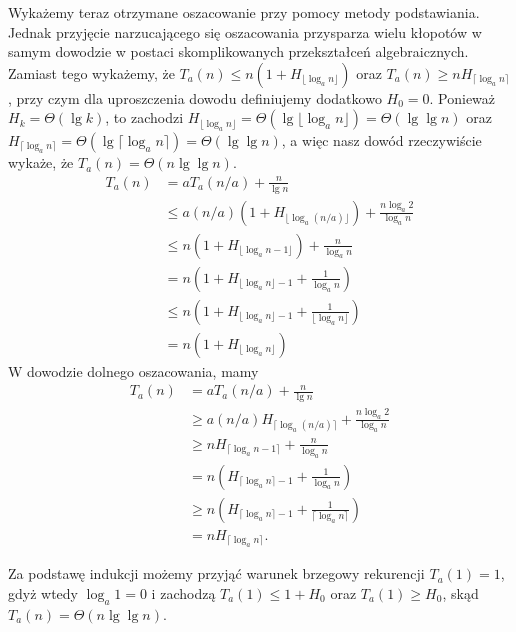 Wykażemy teraz otrzymane oszacowanie przy pomocy metody podstawiania. Jednak przyjęcie narzucającego się oszacowania przysparza wielu kłopotów w samym dowodzie w postaci skomplikowanych przekształceń algebraicznych. Zamiast tego wykażemy, że $T_a(n)\le n(1+H_{\lfloor\log_an\rfloor})$ oraz $T_a(n)\ge nH_{\lceil\log_an\rceil}$, przy czym dla uproszczenia dowodu definiujemy dodatkowo $H_0=0$. Ponieważ $H_k=\Theta(\lg k)$, to zachodzi $H_{\lfloor\log_an\rfloor}=\Theta(\lg\lfloor\log_an\rfloor)=\Theta(\lg\lg n)$ oraz $H_{\lceil\log_an\rceil}=\Theta(\lg\lceil\log_an\rceil)=\Theta(\lg\lg n)$, a więc nasz dowód rzeczywiście wykaże, że $T_a(n)=\Theta(n\lg\lg n)$.
\begin{align*}
	T_a(n) &= aT_a(n/a)+\frac{n}{\lg n} \\
	&\le a(n/a)(1+H_{\lfloor\log_a(n/a)\rfloor})+\frac{n\log_a2}{\log_an} \\
	&\le n(1+H_{\lfloor\log_an-1\rfloor})+\frac{n}{\log_an} \\
	&= n\left(1+H_{\lfloor\log_an\rfloor-1}+\frac{1}{\log_an}\right) \\
	&\le n\left(1+H_{\lfloor\log_an\rfloor-1}+\frac{1}{\lfloor\log_an\rfloor}\right) \\
	&= n(1+H_{\lfloor\log_an\rfloor})
\end{align*}
W dowodzie dolnego oszacowania, mamy
\begin{align*}
	T_a(n) &= aT_a(n/a)+\frac{n}{\lg n} \\
	&\ge a(n/a)H_{\lceil\log_a(n/a)\rceil}+\frac{n\log_a2}{\log_an} \\
	&\ge nH_{\lceil\log_an-1\rceil}+\frac{n}{\log_an} \\
	&= n\left(H_{\lceil\log_an\rceil-1}+\frac{1}{\log_an}\right) \\
	&\ge n\left(H_{\lceil\log_an\rceil-1}+\frac{1}{\lceil\log_an\rceil}\right) \\
	&= nH_{\lceil\log_an\rceil}.
\end{align*}

Za podstawę indukcji możemy przyjąć warunek brzegowy rekurencji $T_a(1)=1$, gdyż wtedy $\log_a1=0$ i zachodzą $T_a(1)\le 1+H_0$ oraz $T_a(1)\ge H_0$, skąd $T_a(n)=\Theta(n\lg\lg n)$.

